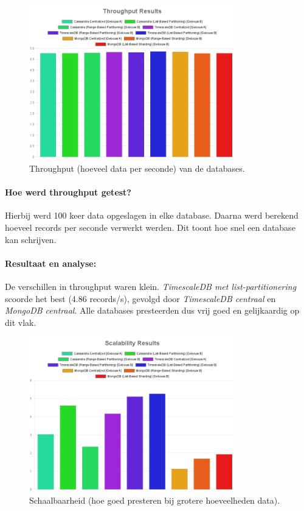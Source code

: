 \begin{figure}[H]
	\centering
	\includegraphics[width=0.8\textwidth]{Throughput.png}
	\caption{Throughput (hoeveel data per seconde) van de databases.}
	\label{fig:throughput-comparison}
\end{figure}

\paragraph{Hoe werd throughput getest?}
Hierbij werd 100 keer data opgeslagen in elke database. Daarna werd berekend hoeveel records per seconde verwerkt werden. Dit toont hoe snel een database kan schrijven.

\paragraph{Resultaat en analyse:}
De verschillen in throughput waren klein. \textit{TimescaleDB met list-partitionering} scoorde het best (4.86 records/s), gevolgd door \textit{TimescaleDB centraal} en \textit{MongoDB centraal}. Alle databases presteerden dus vrij goed en gelijkaardig op dit vlak.

\begin{figure}[H]
	\centering
	\includegraphics[width=0.8\textwidth]{Scalability.png}
	\caption{Schaalbaarheid (hoe goed presteren bij grotere hoeveelheden data).}
	\label{fig:scalability-comparison}
\end{figure}

